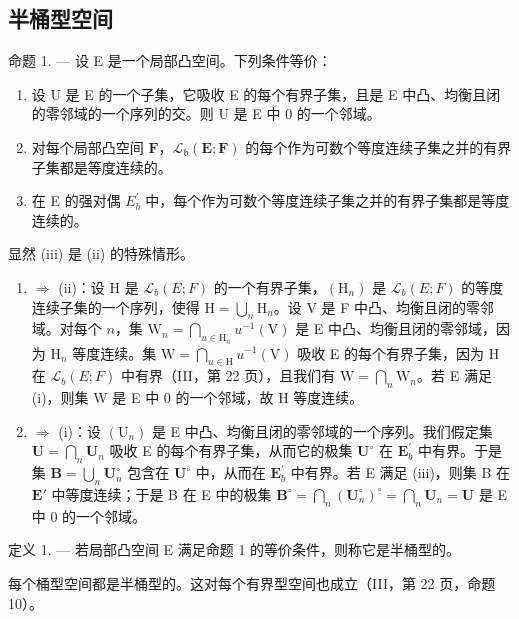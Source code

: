 \subsection{半桶型空间}

命题 1. --- 设 E 是一个局部凸空间。下列条件等价：

\begin{enumerate}
\def\labelenumi{(\roman{enumi})}
\item
  设 U 是 E 的一个子集，它吸收 E 的每个有界子集，且是 E 中凸、均衡且闭的零邻域的一个序列的交。则 U 是 E 中 0 的一个邻域。
\item
  对每个局部凸空间 \(\mathbf{F}\)，\(\mathcal{L}_{\mathfrak{b}}(\mathbf{E};\mathbf{F})\) 的每个作为可数个等度连续子集之并的有界子集都是等度连续的。
\item
  在 E 的强对偶 \(E_{b}^{\prime}\) 中，每个作为可数个等度连续子集之并的有界子集都是等度连续的。
\end{enumerate}

显然 (iii) 是 (ii) 的特殊情形。

\begin{enumerate}
\def\labelenumi{(\roman{enumi})}
\item
  \(\Rightarrow\) (ii)：设 H 是 \(\mathcal{L}_b(E;F)\) 的一个有界子集，\((\mathrm{H}_n)\) 是 \(\mathcal{L}_b(E;F)\) 的等度连续子集的一个序列，使得 \(\mathrm{H} = \bigcup_{n}\mathrm{H}_{n}\)。设 V 是 F 中凸、均衡且闭的零邻域。对每个 \(n\)，集 \(\mathrm{W}_n = \bigcap_{u\in \mathrm{H}_n}u^{-1}(\mathrm{V})\) 是 E 中凸、均衡且闭的零邻域，因为 \(\mathrm{H}_n\) 等度连续。集 \(\mathrm{W} = \bigcap_{u\in \mathrm{H}}u^{-1}(\mathrm{V})\) 吸收 E 的每个有界子集，因为 H 在 \(\mathcal{L}_b(E;F)\) 中有界（III，第 22 页），且我们有 \(\mathrm{W} = \bigcap_{n}\mathrm{W}_{n}\)。若 E 满足 (i)，则集 W 是 E 中 0 的一个邻域，故 H 等度连续。
\item
  \(\Rightarrow\) (i)：设 \((\mathrm{U}_n)\) 是 E 中凸、均衡且闭的零邻域的一个序列。我们假定集 \(\mathbf{U} = \bigcap_{n}\mathbf{U}_{n}\) 吸收 E 的每个有界子集，从而它的极集 \(\mathbf{U}^{\circ}\) 在 \(\mathbf{E}_b^\prime\) 中有界。于是集 \(\mathbf{B} = \bigcup_{n}\mathbf{U}_{n}^{\circ}\) 包含在 \(\mathbf{U}^{\circ}\) 中，从而在 \(\mathbf{E}_b^\prime\) 中有界。若 E 满足 (iii)，则集 B 在 \(\mathbf{E}'\) 中等度连续；于是 B 在 E 中的极集 \(\mathbf{B}^{\circ} = \bigcap_{n}(\mathbf{U}_{n}^{\circ})^{\circ} = \bigcap_{n}\mathbf{U}_{n} = \mathbf{U}\) 是 E 中 0 的一个邻域。
\end{enumerate}

定义 1. --- 若局部凸空间 E 满足命题 1 的等价条件，则称它是半桶型的。

每个桶型空间都是半桶型的。这对每个有界型空间也成立（III，第 22 页，命题 10）。

